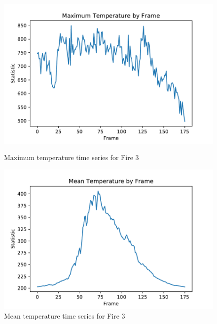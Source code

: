 \documentclass{article}
\begin{document}
\begin{figure}[ht] 
\centering
  \label{ fig7} 
  \begin{minipage}[b]{0.5\linewidth}
    \centering
    \includegraphics[width=1.05\linewidth]{../plots/f3_maxtemp.pdf} 
    \caption{Maximum temperature time series for Fire 3} 
    \vspace{4ex}
  \end{minipage}%
  \begin{minipage}[b]{0.5\linewidth}
    \centering
    \includegraphics[width=1.05\linewidth]{../plots/f3_meantemp.pdf} 
    \caption{Mean temperature time series for Fire 3} 
    \vspace{4ex}
  \end{minipage} 
  \begin{minipage}[b]{0.5\linewidth}
    \centering

\end{minipage}
\end{figure}
\end{document}
